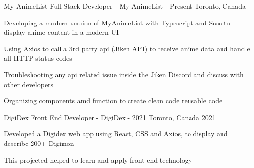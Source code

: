 


\begin{cventries}

\cventry
{My AnimeList} %
{Full Stack Developer - My AnimeList - Present} %
{Toronto, Canada} %
{} %
{ %
\begin{cvitems}
\item {Developing a modern version of MyAnimeList with Typescript and Sass to display anime content in a modern UI} 
\item {Using Axios to call a 3rd party api (Jiken API) to receive anime data and handle all HTTP status codes } 
\item {Troubleshooting any api related issue inside the Jiken Discord and discuss with other developers} 
\item {Organizing components amd function to create clean code reusable code} 
\end{cvitems}
}

% 


\cventry
{DigiDex} %
{Front End Developer - DigiDex - 2021} %
{Toronto, Canada} %
{2021} %
{ %
\begin{cvitems}
\item {Developed a Digidex web app using React, CSS and Axios, to display and describe 200+ Digimon} 
\item {This projected helped to learn and apply front end technology } 
\end{cvitems}
}



\end{cventries}
